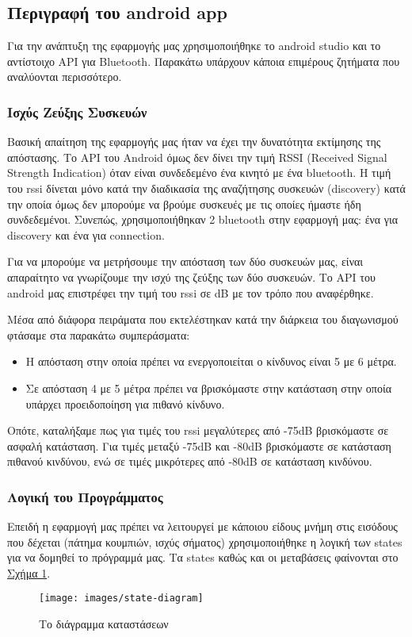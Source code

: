 \subsection{Περιγραφή του android app}
Για την ανάπτυξη της εφαρμογής μας χρησιμοποιήθηκε το android studio και το αντίστοιχο API για Bluetooth.
Παρακάτω υπάρχουν κάποια επιμέρους ζητήματα που αναλύονται περισσότερο.

\subsubsection{Ισχύς Ζεύξης Συσκευών}
Βασική απαίτηση της εφαρμογής μας ήταν να έχει την δυνατότητα εκτίμησης της απόστασης.
Το API του Android όμως δεν δίνει την τιμή RSSI (Received Signal Strength Indication) όταν είναι συνδεδεμένο ένα κινητό με ένα bluetooth.
Η τιμή του rssi δίνεται μόνο κατά την διαδικασία της αναζήτησης συσκευών (discovery) κατά την οποία όμως δεν μπορούμε να βρούμε συσκευές με τις οποίες ήμαστε ήδη συνδεδεμένοι.
Συνεπώς, χρησιμοποιήθηκαν 2 bluetooth στην εφαρμογή μας: ένα για discovery και ένα για connection.

Για να μπορούμε να μετρήσουμε την απόσταση των δύο συσκευών μας, είναι
απαραίτητο να γνωρίζουμε την ισχύ της ζεύξης των δύο συσκευών.
Το API του android μας επιστρέφει την τιμή του rssi σε dB με τον τρόπο που αναφέρθηκε.

Μέσα από διάφορα πειράματα που εκτελέστηκαν κατά την διάρκεια του διαγωνισμού
φτάσαμε στα παρακάτω συμπεράσματα:
\begin{itemize}
\item Η απόσταση στην οποία πρέπει να ενεργοποιείται ο κίνδυνος είναι 5 με 6
μέτρα.
\item Σε απόσταση 4 με 5 μέτρα πρέπει να βρισκόμαστε στην κατάσταση στην οποία
υπάρχει προειδοποίηση για πιθανό κίνδυνο.
\end{itemize}

Οπότε, καταλήξαμε πως για τιμές του rssi μεγαλύτερες από -75dB βρισκόμαστε σε
ασφαλή κατάσταση.
Για τιμές μεταξύ -75dB και -80dB βρισκόμαστε σε κατάσταση πιθανού
κινδύνου, ενώ σε τιμές μικρότερες από -80dB σε κατάσταση κινδύνου.

\subsubsection{Λογική του Προγράμματος}
Επειδή η εφαρμογή μας πρέπει να λειτουργεί με κάποιου είδους μνήμη στις εισόδους που δέχεται (πάτημα κουμπιών, ισχύς σήματος) χρησιμοποιήθηκε η λογική των states για να δομηθεί το πρόγραμμά μας.
Τα states καθώς και οι μεταβάσεις φαίνονται στο
\renewcommand{\figurename}{Σχήμα}
\hyperref[fig:stdiag]{\figurename{} \ref{fig:stdiag}}.
\begin{figure}[H]
    \centering
    \texttt{[image: images/state-diagram]}
    \caption{Το διάγραμμα καταστάσεων}
    \label{fig:stdiag}
\end{figure}
